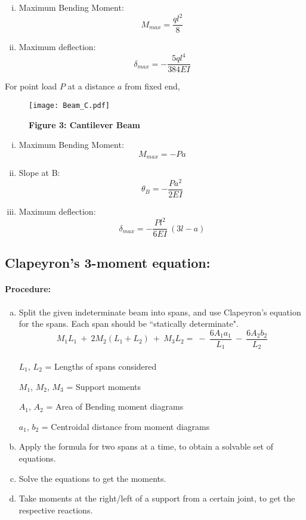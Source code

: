 \documentclass{article}
\begin{document}
{\begin{figure}
\end{figure}
\begin{enumerate}[(i)]
\item Maximum Bending Moment: {\LARGE $$M_{max}=\frac{ql^2}{8}$$}
\item Maximum deflection:
{\LARGE $$\delta_{max}=-\frac{5ql^4}{384EI}{}$$}
\end{enumerate}
\newpage
{\LARGE For point load $P$ at a distance $a$ from fixed end,}
\begin{figure}
\caption*{\Large \textbf{Figure 3: Cantilever Beam}}
\hbox{\hspace{-2.2cm}\texttt{[image: Beam\_C.pdf]}}
\end{figure}
\begin{enumerate}[(i)]
\item Maximum Bending Moment: {\LARGE $$M_{max}=-Pa$$}
\item Slope at B: {\LARGE $$\theta_B=-\frac{Pa^2}{2EI}$$}
\item Maximum deflection:
{\LARGE $$\delta_{max}=-\frac{Pl^2}{6EI}\ (3l-a)$$}
\end{enumerate}
\newpage
\subsection{\LARGE Clapeyron's 3-moment equation:}
\paragraph{\Large Procedure:}
\begin{enumerate}[(a)]
\item Split the given indeterminate beam into spans, and use Clapeyron's equation for the spans. Each span should be ``statically determinate".
{\LARGE $$M_1L_1\ +\ 2M_2(L_1+L_2)\ +\ M_3L_2=\ -\ \frac{6A_1a_1}{L_1}\ -\ \frac{6A_2b_2}{L_2}$$}
\\
{\LARGE $L_1$, $L_2$} = Lengths of spans considered

{\LARGE $M_1$, $M_2$, $M_3$} = Support moments

{\LARGE $A_1$, $A_2$} = Area of Bending moment diagrams

{\LARGE $a_1$, $b_2$} = Centroidal distance from moment diagrams
\\
\item Apply the formula for two spans at a time, to obtain a solvable set of equations.
\item Solve the equations to get the moments.
\item Take moments at the right/left of a support from a certain joint, to get the respective reactions.
\end{enumerate}
}
\end{document}

